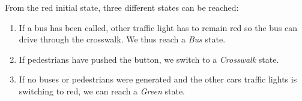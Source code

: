 From the red initial state, three different states can be reached:
\begin{enumerate}
  \item If a bus has been called, other traffic light has to remain red so the bus can drive through the crosswalk. We thus reach a \textit{Bus} state.
  \item If pedestrians have pushed the button, we switch to a \textit{Crosswalk} state.
  \item If no buses or pedestrians were generated and the other cars traffic lights is switching to red, we can reach a \textit{Green} state.
\end{enumerate}

